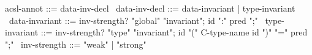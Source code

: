 \begin{syntax}
  acsl-annot ::= data-inv-decl
  \
  data-inv-decl ::= data-invariant | type-invariant
  \
  data-invariant ::= {inv-strength?} "global" "invariant";
                      id ":" pred ";"
  \
  type-invariant ::= {inv-strength?} "type" "invariant";
                      id "(" C-type-name id ")" "=" pred ";"
  \
  {inv-strength} ::= { "weak" } | { "strong" }
\end{syntax}
